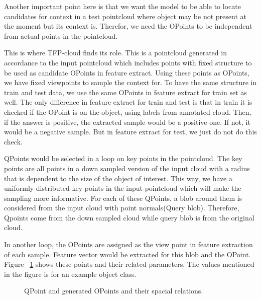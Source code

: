 Another important point here is that we want the model to be able to locate candidates for context in a test pointcloud where 
object may be not present at the moment but its context is.
Therefor, we need the OPoints to be independent from actual points in the pointcloud.

This is where TFP-cloud finds its role.
This is a pointcloud generated in accordance to the input pointcloud which includes points with fixed structure to be used as 
candidate OPoints in feature extract.
Using these points as OPoints, we have fixed viewpoints to sample the context for. 
To have the same structure in train and test data, we use the same OPoints in feature extract for train set as well.
The only difference in feature extract for train and test is that in train it is checked if the OPoint is on the object, using 
labels from annotated cloud. 
Then, if the answer is positive, the extracted sample would be a positive one. 
If not, it would be a negative sample. 
But in feature extract for test, we just do not do this check.

QPoints would be selected in a loop on key points in the pointcloud. 
The key points are all points in a down sampled version of the input cloud with a radius that is dependent to the 
size of the object of interest. 
This way, we have a uniformly distributed key points in the input pointcloud which will make the sampling more informative.
For each of these QPoints, a blob around them is considered from the input cloud with point normals(Query blob).
Therefore, Qpoints come from the down sampled cloud while query blob is from the original cloud.

In another loop, the OPoints are assigned  as the view point in feature extraction of each sample. 
Feature vector would be extracted for this blob and the OPoint. 
Figure ~\ref{PointParameters_Diagram.figure} shows these points and their related parameters. 
The values mentioned in the figure is for an example object class.

\begin{figure}[t]
  \caption[Feature extract structure]
  {QPoint and generated OPoints and their spacial relations.}
  \label{PointParameters_Diagram.figure}
\end{figure}

